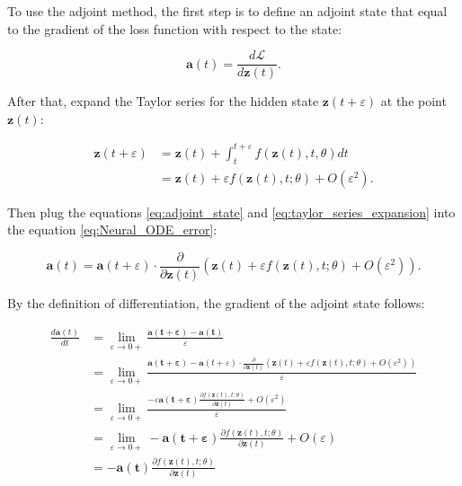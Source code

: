 \documentclass[
	parskip, 			   %
	twoside, 			   %
	DIV=14, 			   %
	BCOR=15.0mm, 		   %
	headsepline, 		   %
	open=right, 		   %
	captions=tableheading, %
	bibliography=totoc,    %
	numbers=noenddot       %
]{scrreprt}
\begin{document}
To use the adjoint method, the first step is to define an adjoint state that equal to the gradient of the loss function with respect to the state:

\begin{equation}
    \label{eq:adjoint_state}
    \mathbf{a}(t) = \frac{d\mathcal{L}}{d\mathbf{z}(t)}.
\end{equation}

After that, expand the Taylor series for the hidden state $\mathbf{z}(t+\varepsilon )$ at the point $\mathbf{z}(t)$:

\begin{equation}
    \label{eq:taylor_series_expansion}
    \begin{aligned}
    \mathbf{z}(t+\varepsilon ) &= \mathbf{z}(t) + \int_{t}^{t+\varepsilon } f(\mathbf{z}(t), t, \theta)dt\\
    &= \mathbf{z}(t) + \varepsilon f(\mathbf{z}(t), t; \theta) + O (\varepsilon ^2).
    \end{aligned}
\end{equation}

Then plug the equations \ref{eq:adjoint_state} and \ref{eq:taylor_series_expansion} into the equation \ref{eq:Neural_ODE_error}:

\begin{equation}
    \label{eq:Neural_ODE_adjoint_state}
    \mathbf{a}(t) = \mathbf{a}(t+\varepsilon ) \cdot \frac{\partial}{\partial \mathbf{z}(t)} (\mathbf{z}(t) + \varepsilon f(\mathbf{z}(t), t; \theta) + O (\varepsilon ^2)) .
\end{equation}

By the definition of differentiation, the gradient of the adjoint state follows:

\begin{equation}
    \label{eq:adjoint_state_gradient_hidden_state}
    \begin{aligned}
        \frac{d\mathbf{a}(t)}{dt} &= \lim_{\varepsilon \to 0+} \frac{\mathbf{a(t+\varepsilon)}-\mathbf{a(t)}}{\varepsilon} \\
        &= \lim_{\varepsilon \to 0+} \frac{\mathbf{a(t+\varepsilon)}-\mathbf{a}(t+\varepsilon ) \cdot \frac{\partial}{\partial \mathbf{z}(t)} (\mathbf{z}(t) + \varepsilon f(\mathbf{z}(t), t; \theta) + O (\varepsilon ^2)) }{\varepsilon}\\
        &= \lim_{\varepsilon \to 0+} \frac{-\varepsilon \mathbf{a(t+\varepsilon)} \frac{\partial f(\mathbf{z}(t), t; \theta)}{\partial \mathbf{z}(t)} + O (\varepsilon ^2)}{\varepsilon}\\
        &= \lim_{\varepsilon \to 0+} - \mathbf{a(t+\varepsilon)} \frac{\partial f(\mathbf{z}(t), t; \theta)}{\partial \mathbf{z}(t)} + O (\varepsilon)\\
        &= - \mathbf{a(t)} \frac{\partial f(\mathbf{z}(t), t; \theta)}{\partial \mathbf{z}(t)}
    \end{aligned}
\end{equation}
\end{document}
